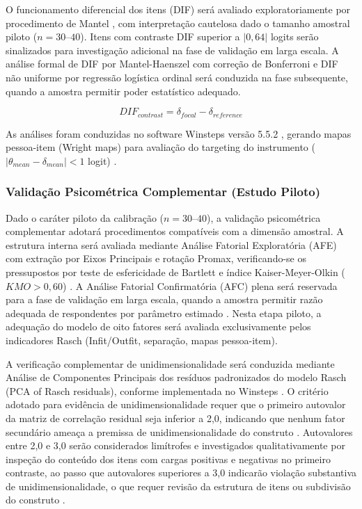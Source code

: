 O funcionamento diferencial dos itens (DIF) será avaliado exploratoriamente por procedimento de Mantel \cite{Bond2020ApplyingSciences}, com interpretação cautelosa dado o tamanho amostral piloto ($n = 30$--$40$). Itens com contraste DIF superior a $|0{,}64|$ logits serão sinalizados para investigação adicional na fase de validação em larga escala. A análise formal de DIF por Mantel-Haenszel com correção de Bonferroni e DIF não uniforme por regressão logística ordinal será conduzida na fase subsequente, quando a amostra permitir poder estatístico adequado.

\begin{equation}
DIF_{contrast} = \delta_{focal} - \delta_{reference}
\label{eq:dif_cap4}
\end{equation}

As análises foram conduzidas no software Winsteps versão 5.5.2 \cite{Linacre2023}, gerando mapas pessoa-item (Wright maps) para avaliação do targeting do instrumento ($|\theta_{mean} - \delta_{mean}| < 1$ logit) \cite{Bond2020}.

\subsubsection{Validação Psicométrica Complementar (Estudo Piloto)}

Dado o caráter piloto da calibração ($n = 30$--$40$), a validação psicométrica complementar adotará procedimentos compatíveis com a dimensão amostral. A estrutura interna será avaliada mediante Análise Fatorial Exploratória (AFE) \cite{Fabrigar1999} com extração por Eixos Principais e rotação Promax, verificando-se os pressupostos por teste de esfericidade de Bartlett e índice Kaiser-Meyer-Olkin ($KMO > 0{,}60$) \cite{Kaiser1974}. A Análise Fatorial Confirmatória (AFC) plena será reservada para a fase de validação em larga escala, quando a amostra permitir razão adequada de respondentes por parâmetro estimado \cite{Brown2015}. Nesta etapa piloto, a adequação do modelo de oito fatores será avaliada exclusivamente pelos indicadores Rasch (Infit/Outfit, separação, mapas pessoa-item).

A verificação complementar de unidimensionalidade será conduzida mediante Análise de Componentes Principais dos resíduos padronizados do modelo Rasch (PCA of Rasch residuals), conforme implementada no Winsteps \cite{Linacre2023}. O critério adotado para evidência de unidimensionalidade requer que o primeiro autovalor da matriz de correlação residual seja inferior a 2,0, indicando que nenhum fator secundário ameaça a premissa de unidimensionalidade do construto \cite{Smith2002,Linacre2023}. Autovalores entre 2,0 e 3,0 serão considerados limítrofes e investigados qualitativamente por inspeção do conteúdo dos itens com cargas positivas e negativas no primeiro contraste, ao passo que autovalores superiores a 3,0 indicarão violação substantiva de unidimensionalidade, o que requer revisão da estrutura de itens ou subdivisão do construto \cite{Bond2020}.

